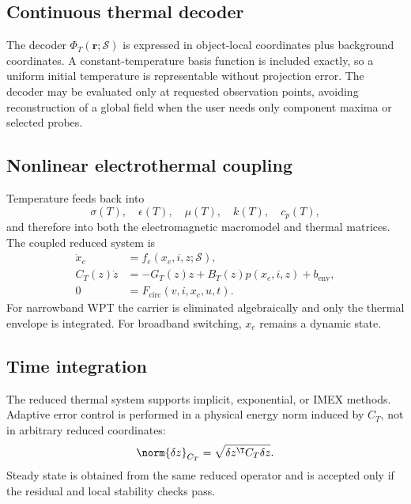\subsection{Continuous thermal decoder}

The decoder $\Phi_T(\mathbf r;\mathcal S)$ is expressed in object-local
coordinates plus background coordinates. A constant-temperature basis function
is included exactly, so a uniform initial temperature is representable without
projection error. The decoder may be evaluated only at requested observation
points, avoiding reconstruction of a global field when the user needs only
component maxima or selected probes.

\subsection{Nonlinear electrothermal coupling}

Temperature feeds back into
\[
 \sigma(T),\quad \epsilon(T),\quad \mu(T),\quad
 k(T),\quad c_p(T),
\]
and therefore into both the electromagnetic macromodel and thermal matrices.
The coupled reduced system is
\[
 \begin{aligned}
  \dot x_e &= f_e(x_e,i,z;\mathcal S),\\
  C_T(z)\dot z
    &=-G_T(z)z+B_T(z)p(x_e,i,z)+b_{\mathrm{env}},\\
  0&=F_{\mathrm{circ}}(v,i,x_c,u,t).
 \end{aligned}
\]
For narrowband WPT the carrier is eliminated algebraically and only the thermal
envelope is integrated. For broadband switching, $x_e$ remains a dynamic state.

\subsection{Time integration}

The reduced thermal system supports implicit, exponential, or IMEX methods.
Adaptive error control is performed in a physical energy norm induced by
$C_T$, not in arbitrary reduced coordinates:
\[
 \norm{\delta z}_{C_T}
 =\sqrt{\delta z^\T C_T\delta z}.
\]
Steady state is obtained from the same reduced operator and is accepted only if
the residual and local stability checks pass.
